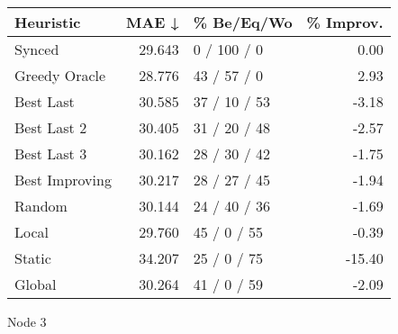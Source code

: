 \begin{tabular}{lrlr}
\toprule
\textbf{Heuristic} & \textbf{MAE ↓} & \textbf{\% Be/Eq/Wo} & \textbf{\% Improv.} \\
\midrule
            Synced &         29.643 &          0 / 100 / 0 &                0.00 \\
     Greedy Oracle &         28.776 &          43 / 57 / 0 &                2.93 \\
         Best Last &         30.585 &         37 / 10 / 53 &               -3.18 \\
       Best Last 2 &         30.405 &         31 / 20 / 48 &               -2.57 \\
       Best Last 3 &         30.162 &         28 / 30 / 42 &               -1.75 \\
    Best Improving &         30.217 &         28 / 27 / 45 &               -1.94 \\
            Random &         30.144 &         24 / 40 / 36 &               -1.69 \\
             Local &         29.760 &          45 / 0 / 55 &               -0.39 \\
            Static &         34.207 &          25 / 0 / 75 &              -15.40 \\
            Global &         30.264 &          41 / 0 / 59 &               -2.09 \\
\bottomrule
\end{tabular}
\caption{Node 3}
\label{tab:non_lr05_le2_bs2_3}
